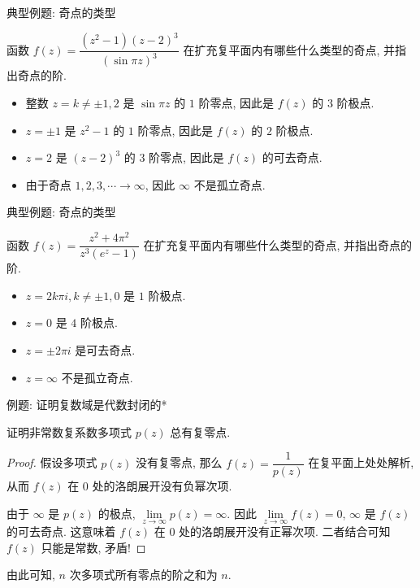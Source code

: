 \begin{frame}{典型例题: 奇点的类型}
\begin{example}
函数 $f(z)=\dfrac{(z^2-1)(z-2)^3}{(\sin{\pi z})^3}$ 在扩充复平面内有哪些什么类型的奇点, 并指出奇点的阶.
\end{example}
\begin{solution}
\begin{itemize}
\item 整数 $z=k\neq \pm1,2$ 是 $\sin{\pi z}$ 的 $1$ 阶零点, 因此是 $f(z)$ 的 3 阶极点.
\item $z=\pm1$ 是 $z^2-1$ 的 $1$ 阶零点, 因此是 $f(z)$ 的 $2$ 阶极点.
\item $z=2$ 是 $(z-2)^3$ 的 $3$ 阶零点, 因此是 $f(z)$ 的可去奇点.
\item 由于奇点 $1,2,3,\cdots\to \infty$, 因此 $\infty$ 不是孤立奇点.\qedhere
\end{itemize}
\end{solution}
\end{frame}


\begin{frame}{典型例题: 奇点的类型}
\begin{exercise}
函数 $f(z)=\dfrac{z^2+4\pi^2}{z^3(e^z-1)}$ 在扩充复平面内有哪些什么类型的奇点, 并指出奇点的阶.
\end{exercise}
\begin{answer}
\begin{itemize}
\item $z=2k\pi i,k\neq \pm1,0$ 是 $1$ 阶极点.
\item $z=0$ 是 $4$ 阶极点.
\item $z=\pm 2\pi i$ 是可去奇点.
\item $z=\infty$ 不是孤立奇点.
\end{itemize}
\end{answer}
\end{frame}


\begin{frame}{例题: 证明复数域是代数封闭的*}
\begin{example}
证明非常数复系数多项式 $p(z)$ 总有复零点.
\end{example}
\begin{proof}
\indent
假设多项式 $p(z)$ 没有复零点, 那么 $f(z)=\dfrac1{p(z)}$ 在复平面上处处解析, 
\onslide<+->
从而 $f(z)$ 在 $0$ 处的洛朗展开没有负幂次项.

\indent
\onslide<+->
由于 $\infty$ 是 $p(z)$ 的极点, $\lim\limits_{z\to\infty}p(z)=\infty$.
\onslide<+->
因此 $\lim\limits_{z\to\infty}f(z)=0$, $\infty$ 是 $f(z)$ 的可去奇点.
\onslide<+->
这意味着 $f(z)$ 在 $0$ 处的洛朗展开没有正幂次项.
\onslide<+->
二者结合可知 $f(z)$ 只能是常数, 矛盾!
\end{proof}
\onslide<+->
由此可知, $n$ 次多项式所有零点的阶之和为 $n$.
\end{frame}



